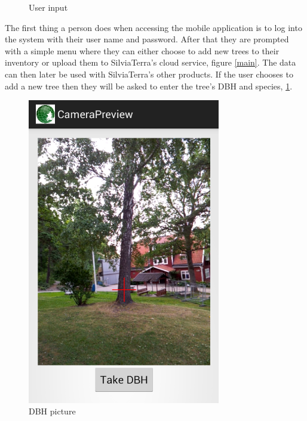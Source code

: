 \begin{figure}[!htb]
	  	\caption{User input}
  		\label{input}
	\endminipage\hfill
\end{figure}
The first thing a person does when accessing the mobile application is to log 
into the system with their user name and password. After that they are 
prompted with a simple menu where they can either choose to add new trees to 
their inventory or upload them to SilviaTerra's cloud service, figure \ref{main}. 
The data can then later be used with SilviaTerra's other products. If the user 
chooses to add a new tree then they will be asked to enter the tree's DBH and 
species, \ref{input}. 
\begin{figure}[!htb]
		\centering
  		\includegraphics[width=0.75\textwidth]{dbh.png}
	  	\caption{DBH picture}
	  	\label{dbh}
	\endminipage\hfill
		\centering

\end{figure}
